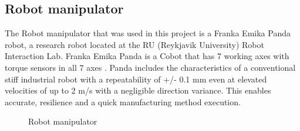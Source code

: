 \subsection{Robot manipulator\label{subsec:robot}}
The Robot manipulator that was used in this project is a Franka Emika Panda robot, a research robot located at the RU (Reykjavik University) Robot Interaction Lab. Franka Emika Panda is a Cobot that has 7 working axes with torque sensors in all 7 axes \cite{gmbh_franka_nodate}. Panda includes the characteristics of a conventional stiff industrial robot with a repeatability of +/- 0.1 mm even at elevated velocities of up to 2 m/s with a negligible direction variance. This enables accurate, resilience and a quick manufacturing method execution. 
\begin{figure}[h]
 \centering
 \hfill
 \caption{Robot manipulator}
 \label{figure: frankaemika}
\end{figure}

